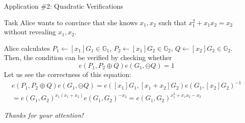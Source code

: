 \documentclass[xcolor={usenames,dvipsnames}]{beamer}
\begin{document}
    \begin{frame}{Application \#2: Quadratic Verifications}
        \begin{block}{Task}
            Alice wants to convince that she knows $x_1,x_2$ such that $x_1^2+x_1x_2=x_2$ without revealing $x_1,x_2$.
        \end{block}

        \pause\begin{example}
            Alice calculates $P_1 \gets [x_1]G_1 \in \mathbb{G}_1$, $P_2 \gets [x_1]G_2 \in \mathbb{G}_2$, $Q \gets [x_2]G_2 \in \mathbb{G}_2$. Then, the condition can be verified by checking whether
            \begin{equation*}
                e(P_1,P_2\oplus Q)e(G_1,\ominus Q) = 1
            \end{equation*}
            \pause Let us see the correctness of this equation:
            \begin{gather*}
                e(P_1,P_2\oplus Q)e(G_1,\ominus Q) = e([x_1]G_1,[x_1+x_2]G_2)e(G_1,[x_2]G_2)^{-1} \nonumber \\= e(G_1,G_2)^{x_1(x_1+x_2)}e(G_1,G_2)^{-x_2} = e(G_1,G_2)^{x_1^2+x_1x_2-x_2}
            \end{gather*}
        \end{example}
    \end{frame}
    
	\begin{frame}{}
      \centering \Large
      \emph{Thanks for your attention!}
    \end{frame}
\end{document}
